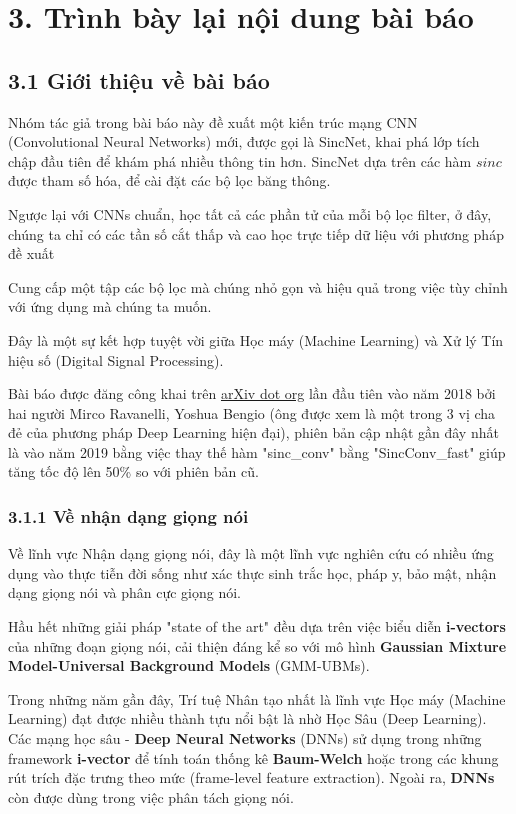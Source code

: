 \documentclass{article}
\begin{document}
	\section{3. Trình bày lại nội dung bài báo}
	
	\subsection{3.1 Giới thiệu về bài báo}
	
	\qquad Nhóm tác giả trong bài báo này đề xuất một kiến trúc mạng CNN (Convolutional Neural Networks) mới, được gọi là SincNet, khai phá lớp tích chập đầu tiên để khám phá nhiều thông tin hơn. SincNet dựa trên các hàm $sinc$ được tham số hóa, để cài đặt các bộ lọc băng thông.
	
	Ngược lại với CNNs chuẩn, học tất cả các phần tử của mỗi bộ lọc filter, ở đây, chúng ta chỉ có các tần số cắt thấp và cao học trực tiếp dữ liệu với phương pháp đề xuất
	
	Cung cấp một tập các bộ lọc mà chúng nhỏ gọn và hiệu quả trong việc tùy chỉnh với ứng dụng mà chúng ta muốn.
	
	Đây là một sự kết hợp tuyệt vời giữa Học máy (Machine Learning) và Xử lý Tín hiệu số (Digital Signal Processing).
	
	Bài báo được đăng công khai trên \href{arxiv.org}{arXiv dot org} lần đầu tiên vào năm 2018 bởi hai người Mirco Ravanelli, Yoshua Bengio (ông được xem là một trong 3 vị cha đẻ của phương pháp Deep Learning hiện đại), phiên bản cập nhật gần đây nhất là vào năm 2019 bằng việc thay thế hàm "sinc\_conv" bằng "SincConv\_fast" giúp tăng tốc độ lên 50\% so với phiên bản cũ.
	
	\subsubsection{3.1.1 Về nhận dạng giọng nói}
	\qquad Về lĩnh vực Nhận dạng giọng nói, đây là một lĩnh vực nghiên cứu có nhiều ứng dụng vào thực tiễn đời sống như xác thực sinh trắc học, pháp y, bảo mật, nhận dạng giọng nói và phân cực giọng nói.
	
	Hầu hết những giải pháp "state of the art" đều dựa trên việc biểu diễn \textbf{i-vectors} của những đoạn giọng nói, cải thiện đáng kể so với mô hình \textbf{Gaussian Mixture Model-Universal Background Models} (GMM-UBMs).
	
	Trong những năm gần đây, Trí tuệ Nhân tạo nhất là lĩnh vực Học máy (Machine Learning) đạt được nhiều thành tựu nổi bật là nhờ Học Sâu (Deep Learning). Các mạng học sâu - \textbf{Deep Neural Networks} (DNNs) sử dụng trong những framework \textbf{i-vector} để tính toán thống kê \textbf{Baum-Welch} hoặc trong các khung rút trích đặc trưng theo mức (frame-level feature extraction). Ngoài ra, \textbf{DNNs} còn được dùng trong việc phân tách giọng nói.
	
\end{document}
